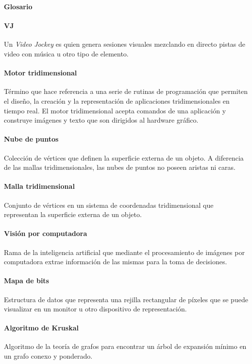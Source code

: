 ﻿\Huge
\textbf{Glosario}

\vspace{10 mm}

\normalsize 

\paragraph{VJ}
Un \emph{Video Jockey} es quien genera sesiones visuales mezclando en directo pistas de video con música u otro tipo de elemento.

\paragraph{Motor tridimensional}
Término que hace referencia a una serie de rutinas de programación que permiten el diseño, la creación y la representación de aplicaciones tridimensionales en tiempo real.
El motor tridimensional acepta comandos de una aplicación y construye imágenes y texto que son dirigidos al hardware gráfico.
 
\paragraph{Nube de puntos}
Colección de vértices que definen la superficie externa de un objeto.
A diferencia de las mallas tridimensionales, las nubes de puntos no poseen aristas ni caras.

\paragraph{Malla tridimensional}
Conjunto de vértices en un sistema de coordenadas tridimensional que representan la superficie externa de un objeto.

\paragraph{Visión por computadora}
Rama de la inteligencia artificial que mediante el procesamiento de imágenes por computadora extrae información de las mismas para la toma de decisiones.

\paragraph{Mapa de bits}
Estructura de datos que representa una rejilla rectangular de píxeles que se puede visualizar en un monitor u otro dispositivo de representación.

\paragraph{Algoritmo de Kruskal}
Algoritmo de la teoría de grafos para encontrar un árbol de expansión mínimo en un grafo conexo y ponderado. 

